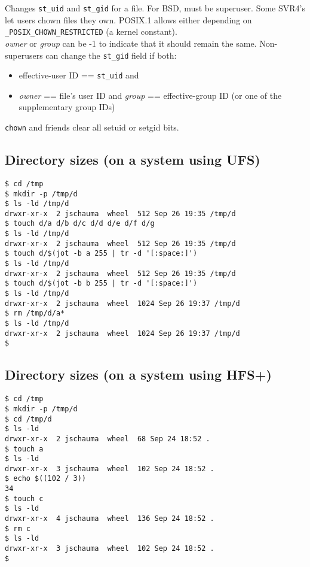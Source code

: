 \documentclass[xga]{xdvislides}
\begin{document}
Changes {\tt st\_uid} and {\tt st\_gid} for a file. For BSD, must be
superuser. Some SVR4's let users chown files they own. POSIX.1 allows either
depending on {\tt \_POSIX\_CHOWN\_RESTRICTED} (a kernel constant).
\\

{\em owner} or {\em group} can be -1 to indicate that it should remain the same.
Non-superusers can change the {\tt st\_gid} field if both:
\begin{itemize}
	\item effective-user ID == {\tt st\_uid} and
	\item {\em owner} == file's user ID and {\em group} == effective-group ID
		(or one of the supplementary group IDs)
\end{itemize}
\addvspace{.5in}
{\tt chown} and friends clear all setuid or setgid bits.

\subsection{Directory sizes (on a system using UFS)}
\begin{verbatim}
$ cd /tmp
$ mkdir -p /tmp/d
$ ls -ld /tmp/d
drwxr-xr-x  2 jschauma  wheel  512 Sep 26 19:35 /tmp/d
$ touch d/a d/b d/c d/d d/e d/f d/g
$ ls -ld /tmp/d
drwxr-xr-x  2 jschauma  wheel  512 Sep 26 19:35 /tmp/d
$ touch d/$(jot -b a 255 | tr -d '[:space:]')
$ ls -ld /tmp/d
drwxr-xr-x  2 jschauma  wheel  512 Sep 26 19:35 /tmp/d
$ touch d/$(jot -b b 255 | tr -d '[:space:]')
$ ls -ld /tmp/d
drwxr-xr-x  2 jschauma  wheel  1024 Sep 26 19:37 /tmp/d
$ rm /tmp/d/a*
$ ls -ld /tmp/d
drwxr-xr-x  2 jschauma  wheel  1024 Sep 26 19:37 /tmp/d
$
\end{verbatim}

\subsection{Directory sizes (on a system using HFS+)}
\begin{verbatim}
$ cd /tmp
$ mkdir -p /tmp/d
$ cd /tmp/d
$ ls -ld
drwxr-xr-x  2 jschauma  wheel  68 Sep 24 18:52 .
$ touch a
$ ls -ld
drwxr-xr-x  3 jschauma  wheel  102 Sep 24 18:52 .
$ echo $((102 / 3))
34
$ touch c
$ ls -ld
drwxr-xr-x  4 jschauma  wheel  136 Sep 24 18:52 .
$ rm c
$ ls -ld
drwxr-xr-x  3 jschauma  wheel  102 Sep 24 18:52 .
$
\end{verbatim}
\end{document}
